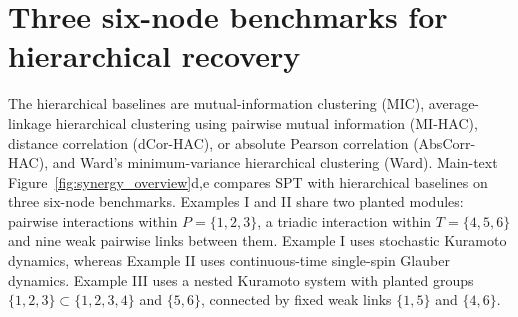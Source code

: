 \documentclass[fleqn,10pt]{wlscirep}
\newcommand{\rev}[1]{\textcolor{red}{#1}}
\begin{document}

\section{Three six-node benchmarks for hierarchical recovery}
\label{app:six_node_hierarchy_comparison}

The hierarchical baselines are mutual-information clustering (MIC), average-linkage hierarchical clustering using pairwise mutual information (MI-HAC), distance correlation (dCor-HAC), or absolute Pearson correlation (AbsCorr-HAC), and Ward's minimum-variance hierarchical clustering (Ward). Main-text Figure~\ref{fig:synergy_overview}d,e compares SPT with hierarchical baselines on three six-node benchmarks. Examples I and II share two planted modules: pairwise interactions within $P=\{1,2,3\}$, a triadic interaction within $T=\{4,5,6\}$ and nine weak pairwise links between them. Example I uses stochastic Kuramoto dynamics, whereas Example II uses continuous-time single-spin Glauber dynamics. Example III uses a nested Kuramoto system with planted groups $\{1,2,3\}\subset\{1,2,3,4\}$ and $\{5,6\}$, connected by fixed weak links $\{1,5\}$ and $\{4,6\}$.
\end{document}
